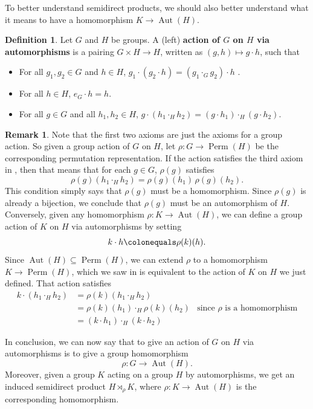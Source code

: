 \documentclass[12pt]{report}
\numberwithin{equation}{section}
\numberwithin{theorem}{chapter}
\theoremstyle{definition}
\newtheorem{definition}[theorem]{Definition}
\newtheorem*{basic properties}{Basic Properties}
\newtheorem*{Important Remark}{Important Remark}
\newtheorem{remark}[theorem]{Remark}
\DeclareMathOperator{\Perm}{Perm}
\def\sdp{\rtimes}
\DeclareMathOperator{\Aut}{Aut}
\begin{document}
To better understand semidirect products, we should also better understand what it means to have a homomorphism $K \to \Aut(H)$.


\begin{definition}\label{def action via autos}
Let $G$ and $H$ be groups. A (left) {\bf action of $G$ on $H$ via automorphisms} is a pairing $G \times H \to H$, written as $(g,h) \mapsto g \cdot h$, such that
\begin{itemize}[itemsep=-0.1em]
\item For all $g_1, g_2 \in G$ and $h \in H$, $g_1 \cdot (g_2 \cdot h) = (g_1 \cdot _G g_2) \cdot h$ .
\item For all $h \in H$, $e_G \cdot h = h$.
\item For all $g \in G$ and all $h_1, h_2 \in H$,  $g \cdot (h_1 \cdot_H h_2) = (g \cdot h_1) \cdot_H (g \cdot h_2)$.
\end{itemize} 	
\end{definition}

\begin{remark}
Note that the first two axioms are just the axioms for a group action. So given a group action of $G$ on $H$, let $\rho\!: G \to \Perm(H)$ be the corresponding permutation representation. If the action satisfies the third axiom in , then that means that for each $g \in G$, $\rho(g)$ satisfies
$$\rho(g) (h_1 \cdot_H h_2) = \rho(g)(h_1) \, \rho(g)(h_2).$$
This condition simply says that $\rho(g)$ must be a homomorphism. Since $\rho(g)$ is already a bijection, we conclude that $\rho(g)$ must be an automorphism of $H$. 
Conversely, given any homomorphism $\rho\!: K \to \Aut(H)$, we can define a group action of $K$ on $H$ via automorphisms by setting
$$k \cdot h \colonequals \rho(k)(h).$$
Since $\Aut(H) \subseteq \Perm(H)$, we can extend $\rho$ to a homomorphism $K \to \Perm(H)$, which we saw in  is equivalent to the action of $K$ on $H$ we just defined. That action satisfies
$$\begin{aligned}
k \cdot (h_1 \cdot_H h_2) & = \rho(k)(h_1 \cdot_H h_2) \\
& = \rho(k)(h_1) \cdot_H \rho(k)(h_2) & \text{since $\rho$ is a homomorphism} \\
& = (k \cdot h_1) \cdot_H (k \cdot h_2)
\end{aligned}$$


In conclusion, we can now say that to give an action of $G$ on $H$ via automorphisms is to give a group homomorphism 
$$\rho\!: G \to \Aut(H).$$
Moreover, given a group $K$ acting on a group $H$ by automorphisms, we get an induced semidirect product $H \sdp_\rho K$, where $\rho\!: K \to \Aut(H)$ is the corresponding homomorphism. 
\end{remark}
\end{document}
